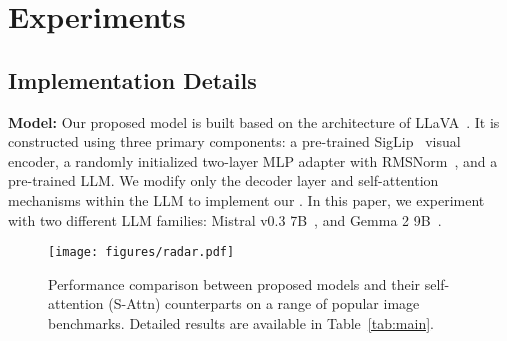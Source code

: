 \section{Experiments}

\subsection{Implementation Details}


\textbf{Model:} Our proposed \method{} model is built based on the architecture of LLaVA~\citep{llava}.
It is constructed using three primary components: a pre-trained SigLip~\citep{zhai2023sigmoid} visual encoder, a randomly initialized two-layer MLP adapter with RMSNorm~\citep{zhang2019root}, and a pre-trained LLM.
We modify only the decoder layer and self-attention mechanisms within the LLM to implement our \method{}.
In this paper, we experiment with two different LLM families: Mistral v0.3 7B~\citep{jiang2023mistral}, and Gemma 2 9B~\citep{team2024gemma}.


\begin{wrapfigure}{r}{0.4\linewidth}
  \vspace{-24pt}
  \begin{center}
    \texttt{[image: figures/radar.pdf]}
  \end{center}
  \vspace{-5pt}
  \caption{Performance comparison between proposed \method{} models and their self-attention (S-Attn) counterparts on a range of popular image benchmarks. Detailed results are available in Table~\ref{tab:main}.}\label{fig:radar}
  \vspace{-18pt}
\end{wrapfigure}

